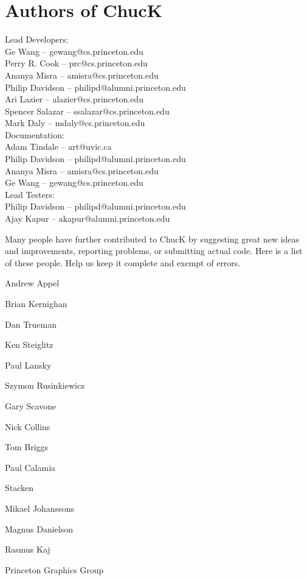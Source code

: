 \newpage
\section{Authors of ChucK}

Lead Developers:\\
\authtab Ge Wang -- gewang@cs.princeton.edu\\
\authtab Perry R. Cook -- prc@cs.princeton.edu\\
\authtab Ananya Misra -- amisra@cs.princeton.edu\\
\authtab Philip Davidson -- philipd@alumni.princeton.edu\\
\authtab Ari Lazier -- alazier@cs.princeton.edu\\
\authtab Spencer Salazar -- ssalazar@cs.princeton.edu\\
\authtab Mark Daly -- mdaly@cs.princeton.edu\\

Documentation:\\
\authtab Adam Tindale -- art@uvic.ca\\
\authtab Philip Davidson -- philipd@alumni.princeton.edu\\
\authtab Ananya Misra -- amisra@cs.princeton.edu\\
\authtab Ge Wang -- gewang@cs.princeton.edu\\

Lead Testers:\\
\authtab Philip Davidson -- philipd@alumni.princeton.edu\\
\authtab Ajay Kapur -- akapur@alumni.princeton.edu



Many people have further contributed to ChucK by suggesting great new 
ideas and improvements, reporting problems, or submitting actual code. 
Here is a list of these people.  Help us keep it complete and exempt of 
errors.

\begin{chuckitemize}
\item Andrew Appel 
\item Brian Kernighan 
\item Dan Trueman 
\item Ken Steiglitz 
\item Paul Lansky 
\item Szymon Rusinkiewicz 
\item Gary Scavone 
\item Nick Collins 
\item Tom Briggs 
\item Paul Calamia 
\item Stacken 
  \begin{chuckitemize}
  \item Mikael Johanssons 
  \item Magnus Danielson 
  \item Rasmus Kaj 
  \end{chuckitemize}
\item Princeton Graphics Group
\end{chuckitemize}
